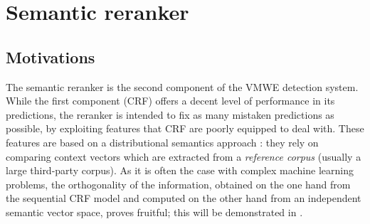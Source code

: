 \documentclass[output=paper
,modfonts
,nonflat]{langsci/langscibook}
\begin{document}






\section{\label{subsec:Sem}Semantic reranker}

\subsection{Motivations}

The semantic reranker is the second component of the VMWE detection
system. While the first component (CRF) offers a decent level of
performance in its predictions, the reranker is intended to fix as
many mistaken predictions as possible, by exploiting features that CRF
are poorly equipped to deal with. These features are based on a
distributional semantics approach \citep{schutze1998,maldonado2011}:
they rely on comparing context vectors which are extracted from a {\em
  reference corpus} (usually a large third-party corpus). As it is
often the case with complex machine learning problems, the
orthogonality of the information, obtained on the one hand from the
sequential CRF model and computed on the other hand from an independent
semantic vector space, proves fruitful; this will be demonstrated in
.
\end{document}
